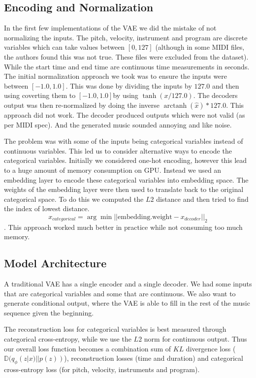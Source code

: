 \documentclass{article}
\DeclareMathOperator\arctanh{arctanh}
\begin{document}
\subsection{Encoding and Normalization}

In the first few implementations of the VAE we did the mistake of not normalizing the inputs. The pitch, velocity, instrument and program are discrete variables which can take values between $[0, 127]$ (although in some MIDI files, the authors found this was not true. These files were excluded from the dataset). While the start time and end time are continuous time measurements in seconds. The initial normalization approach we took was to ensure the inputs were between $[-1.0, 1.0]$. This was done by dividing the inputs by $127.0$ and then using coverting them to $[-1.0, 1.0]$by using $\tanh(x/127.0)$. The decoders output was then re-normalized by doing the inverse $\arctanh(\hat{x}) * 127.0$. This approach did not work. The decoder produced outputs which were not valid (as per MIDI spec). And the generated music sounded annoying and like noise.

The problem was with some of the inputs being categorical variables instead of continuous variables. This led us to consider alternative ways to encode the categorical variables. Initially we considered one-hot encoding, however this lead to a huge amount of memory consumption on GPU. Instead we used an embedding layer to encode these categorical variables into embedding space. The weights of the embedding layer were then used to translate back to the original categorical space. To do this we computed the $L2$ distance and then tried to find the index of lowest distance. $$ x_{categorical} = \arg \min || \mathrm{embedding.weight} - x_{decoder}||_2 $$. This approach worked much better in practice while not consuming too much memory.


\subsection{Model Architecture}

A traditional VAE has a single encoder and a single decoder. We had some inputs that are categorical variables and some that are continuous. We also want to generate conditional output, where the VAE is able to fill in the rest of the music sequence given the beginning. 

The reconstruction loss for categorical variables is best measured through categorical cross-entropy, while we use the $L2$ norm for continuous output. Thus our overall loss function becomes a combination sum of $KL$ divergence loss ($\mathbb{D}(q_{\phi}(z|x) || p(z))$), reconstruction losses (time and duration) and categorical cross-entropy loss (for pitch, velocity, instruments and program). 
\end{document}
